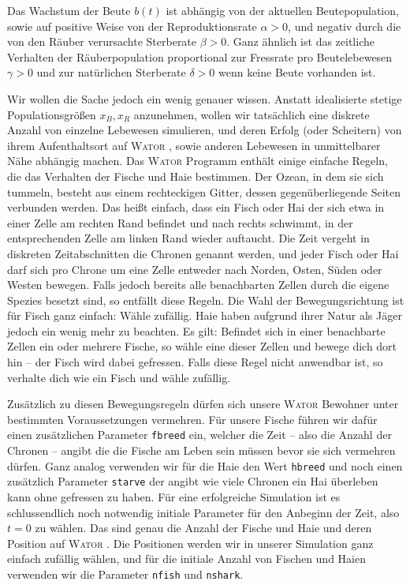 \documentclass[a4paper,11pt]{article}
\newcommand{\wator}{\textsc{Wator }}
\theoremstyle{definition}
\numberwithin{equation}{section}
\begin{document}
	Das Wachstum der Beute $b(t)$ ist abhängig von der aktuellen Beutepopulation, sowie auf positive Weise von der Reproduktionsrate $\alpha > 0$, und negativ durch die von den Räuber verursachte Sterberate $\beta > 0$. Ganz ähnlich ist das zeitliche Verhalten der Räuberpopulation proportional zur Fressrate pro Beutelebewesen $\gamma > 0$ und zur natürlichen Sterberate $\delta > 0$ wenn keine Beute vorhanden ist. \newline

	Wir wollen die Sache jedoch ein wenig genauer wissen. Anstatt idealisierte stetige Populationsgrößen $x_B, x_R$ anzunehmen, wollen wir tatsächlich eine diskrete Anzahl von einzelne Lebewesen simulieren, und deren Erfolg (oder Scheitern) von ihrem Aufenthaltsort auf \wator, sowie anderen Lebewesen in unmittelbarer Nähe abhängig machen. Das \wator Programm enthält einige einfache Regeln, die das Verhalten der Fische und Haie bestimmen. Der Ozean, in dem sie sich tummeln, besteht aus einem rechteckigen Gitter, dessen gegenüberliegende Seiten verbunden werden. Das heißt einfach, dass ein Fisch oder Hai der sich etwa in einer Zelle am rechten Rand befindet und nach rechts schwimmt, in der entsprechenden Zelle am linken Rand wieder auftaucht. Die Zeit vergeht in diskreten Zeitabschnitten die Chronen genannt werden, und jeder Fisch oder Hai darf sich pro Chrone um eine Zelle entweder nach Norden, Osten, Süden oder Westen bewegen. Falls jedoch bereits alle benachbarten Zellen durch die eigene Spezies besetzt sind, so entfällt diese Regeln. Die Wahl der Bewegungsrichtung ist für Fisch ganz einfach: Wähle zufällig. Haie haben aufgrund ihrer Natur als Jäger jedoch ein wenig mehr zu beachten. Es gilt: Befindet sich in einer benachbarte Zellen ein oder mehrere Fische, so wähle eine dieser Zellen und bewege dich dort hin -- der Fisch wird dabei gefressen. Falls diese Regel nicht anwendbar ist, so verhalte dich wie ein Fisch und wähle zufällig. \newline

	Zusätzlich zu diesen Bewegungsregeln dürfen sich unsere \wator Bewohner unter bestimmten Voraussetzungen vermehren. Für unsere Fische führen wir dafür einen zusätzlichen Parameter \texttt{fbreed} ein, welcher die Zeit -- also die Anzahl der Chronen -- angibt die die Fische am Leben sein müssen bevor sie sich vermehren dürfen. Ganz analog verwenden wir für die Haie den Wert \texttt{hbreed} und noch einen zusätzlich Parameter \texttt{starve} der angibt wie viele Chronen ein Hai überleben kann ohne gefressen zu haben. Für eine erfolgreiche Simulation ist es schlussendlich noch notwendig initiale Parameter für den Anbeginn der Zeit, also $t = 0$ zu wählen. Das sind genau die Anzahl der Fische und Haie und deren Position auf \wator. Die Positionen werden wir in unserer Simulation ganz einfach zufällig wählen, und für die initiale Anzahl von Fischen und Haien verwenden wir die Parameter \texttt{nfish} und \texttt{nshark}.
\end{document}
